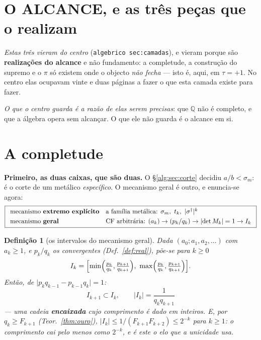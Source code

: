 \documentclass[11pt,a4paper]{article}
\newcommand{\code}[1]{\texttt{\small #1}}
\newtheorem{definicao}[teorema]{Definição}
\newcommand{\dg}{^{\dagger}}
\newcommand{\abs}[1]{\lvert #1\rvert}
\begin{document}
\section{O ALCANCE, e as três peças que o realizam}\label{sec:alcance}

\noindent\emph{Estas três vieram do centro} (\code{algebrico sec:camadas}), e vieram porque
são \textbf{realizações do alcance} e não fundamento: a completude, a construção do supremo
e o $\pi$ só existem onde o objecto \emph{não fecha} --- isto é, aqui, em $\tau=+1$. No
centro elas ocupavam vinte e duas páginas a fazer o que esta camada existe para fazer.

\emph{O que o centro guarda é a razão de elas serem precisas}: que $\mathbb{Q}$ não é
completo, e que a álgebra opera sem alcançar. O que ele não guarda é o alcance em si.

\section{A completude}\label{sec:completude}

\noindent\textbf{Primeiro, as duas caixas, que são duas.} O \S\ref{alg:sec:corte}
decidiu $a/b<\sigma_m$: é o corte de um metálico \emph{específico}. O mecanismo
geral é outro, e enuncia-se agora:
\[
\boxed{
\begin{array}{ll}
\text{mecanismo \textbf{extremo explícito}} &
\text{a família metálica: } \sigma_m,\ t_k,\ \abs{\sigma\dg}^{k}\\[3pt]
\text{mecanismo \textbf{geral}} &
\text{CF arbitrária: } (a_k)\to(p_k/q_k)\to\abs{\det M_k}=1\to I_k
\end{array}}
\]

\begin{definicao}[os intervalos do mecanismo geral]\label{def:Ik}
Dada $(a_0;a_1,a_2,\ldots)$ com $a_k\geq1$, e $p_k/q_k$ os convergentes
(Def.~\ref{def:real}), põe-se para $k\geq0$
\[
I_k=\Bigl[\min\Bigl(\tfrac{p_k}{q_k},\tfrac{p_{k+1}}{q_{k+1}}\Bigr),\
\max\Bigl(\tfrac{p_k}{q_k},\tfrac{p_{k+1}}{q_{k+1}}\Bigr)\Bigr].
\]
Então, de $\abs{p_kq_{k-1}-p_{k-1}q_k}=1$:
\[
\boxed{\;I_{k+1}\subset I_k,\qquad \abs{I_k}=\frac{1}{q_kq_{k+1}}\;}
\]
--- uma cadeia \textbf{encaixada} cujo comprimento é dado em inteiros. E, por
$q_k\geq F_{k+1}$ (Teor.~\ref{thm:ouro}),
$\abs{I_k}\leq 1/(F_{k+1}F_{k+2})\leq2^{-k}$ para $k\geq1$: \emph{o comprimento
cai pelo menos como $2^{-k}$}, e é este o elo que a unicidade usa.
\end{definicao}
\end{document}
